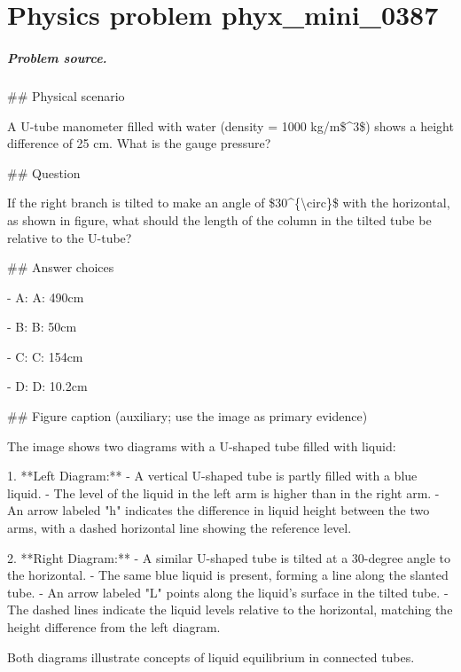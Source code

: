 
\chapter{Physics problem phyx\_mini\_0387}
\label{ch:PhyXMiniProblems_problem_phyx_mini_0387}

\paragraph{Problem source.}
\#\# Physical scenario

A U-tube manometer filled with water (density = 1000 kg/m\$\textasciicircum{}3\$) shows a height difference of 25 cm. What is the gauge pressure?

\#\# Question

If the right branch is tilted to make an angle of \$30\textasciicircum{}\{\textbackslash{}circ\}\$ with the horizontal, as shown in figure, what should the length of the column in the tilted tube be relative to the U-tube?

\#\# Answer choices

- A: A: 490cm

- B: B: 50cm

- C: C: 154cm

- D: D: 10.2cm

\#\# Figure caption (auxiliary; use the image as primary evidence)

The image shows two diagrams with a U-shaped tube filled with liquid:

1. **Left Diagram:**
   - A vertical U-shaped tube is partly filled with a blue liquid.
   - The level of the liquid in the left arm is higher than in the right arm.
   - An arrow labeled "h" indicates the difference in liquid height between the two arms, with a dashed horizontal line showing the reference level.

2. **Right Diagram:**
   - A similar U-shaped tube is tilted at a 30-degree angle to the horizontal.
   - The same blue liquid is present, forming a line along the slanted tube.
   - An arrow labeled "L" points along the liquid's surface in the tilted tube.
   - The dashed lines indicate the liquid levels relative to the horizontal, matching the height difference from the left diagram.

Both diagrams illustrate concepts of liquid equilibrium in connected tubes.

